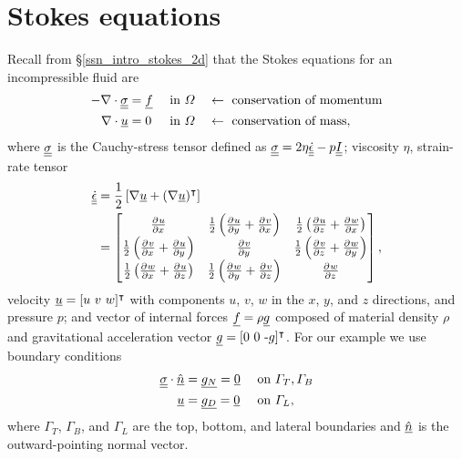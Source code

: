 
\section{Stokes equations} \label{ssn_intro_stokes_3d}

Recall from \S \ref{ssn_intro_stokes_2d} that the Stokes equations for an incompressible fluid are
\begin{align}
  \label{intro_stokes_3d_momentum}
  -\nabla \cdot \underline{\underline{\sigma}} &= \underline{f} &&\text{ in } \varOmega &&\leftarrow \text{ conservation of momentum} \\
  \label{intro_stokes_3d_mass}
  \nabla \cdot \underline{u} &= 0 &&\text{ in } \varOmega &&\leftarrow \text{ conservation of mass},
\end{align}
where $\underline{\underline{\sigma}}$ is the Cauchy-stress tensor defined as $\underline{\underline{\sigma}} = 2\eta \underline{\underline{\dot{\epsilon}}} - p\underline{\underline{I}}$; viscosity $\eta$, strain-rate tensor
\begin{align}
  \label{intro_strain_rate_tensor}
  \underline{\underline{\dot{\epsilon}}} &= \frac{1}{2}\left[\nabla \underline{u} + (\nabla \underline{u})^\intercal \right] \notag \\
  &= \begin{bmatrix}
       \frac{\partial^{} u}{\partial x^{} } & \frac{1}{2}\left( \frac{\partial^{} u}{\partial y^{} } + \frac{\partial^{} v}{\partial x^{} } \right) & \frac{1}{2}\left( \frac{\partial^{} u}{\partial z^{} } + \frac{\partial^{} w}{\partial x^{} } \right) \\
       \frac{1}{2}\left( \frac{\partial^{} v}{\partial x^{} } + \frac{\partial^{} u}{\partial y^{} } \right) & \frac{\partial^{} v}{\partial y^{} } & \frac{1}{2}\left( \frac{\partial^{} v}{\partial z^{} } + \frac{\partial^{} w}{\partial y^{} } \right) \\
       \frac{1}{2}\left( \frac{\partial^{} w}{\partial x^{} } + \frac{\partial^{} u}{\partial z^{} } \right) & \frac{1}{2}\left( \frac{\partial^{} w}{\partial y^{} } + \frac{\partial^{} v}{\partial z^{} } \right) & \frac{\partial^{} w}{\partial z^{} }
     \end{bmatrix},
\end{align}
velocity $\underline{u} = [u\ v\ w]^\intercal$ with components $u$, $v$, $w$ in the $x$, $y$, and $z$ directions, and pressure $p$; and vector of internal forces $\underline{f} = \rho \underline{g}$ composed of material density $\rho$ and gravitational acceleration vector $\underline{g} = [0\ 0\ \text{-}g]^\intercal$.  For our example we use boundary conditions
\begin{align}
  \label{intro_stokes_3d_bc_n}
  \underline{\underline{\sigma}} \cdot \underline{\hat{n}} &= \underline{g_N} = \underline{0} &&\text{ on } \varGamma_T, \varGamma_B \\
  \label{intro_stokes_3d_bc_d}
  \underline{u} &= \underline{g_D} = \underline{0} && \text{ on } \varGamma_L,
\end{align}
where $\Gamma_T$, $\Gamma_B$, and $\Gamma_L$ are the top, bottom, and lateral boundaries and $\underline{\hat{n}}$ is the outward-pointing normal vector.


